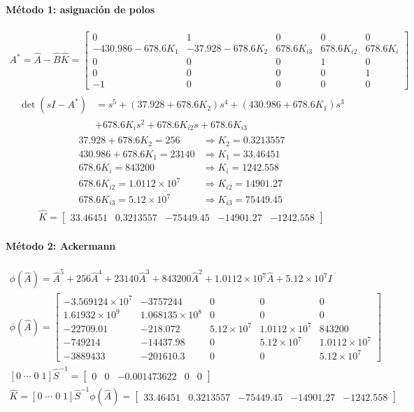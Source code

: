 \documentclass[11pt]{article}
\begin{document}
\paragraph{Método 1: asignación de polos}
\begin{gather*}
A^*=\hat A-\hat B\hat K=\begin{bmatrix}0&1&0&0&0\\-430.986-678.6K_1&-37.928-678.6K_2&678.6K_{i3}&678.6K_{i2}&678.6K_i\\0&0&0&1&0\\0&0&0&0&1\\-1&0&0&0&0\end{bmatrix}
\end{gather*}
\begin{gather*}
\begin{aligned}\det(sI-A^*)&=s^{5}+(37.928+678.6K_2)s^{4}+(430.986+678.6K_1)s^{3}\\&+678.6K_is^{2}+678.6K_{i2}s+678.6K_{i3}\end{aligned}
\end{gather*}
\begin{align*}
37.928+678.6K_2=256&\Rightarrow K_2=0.3213557\\
430.986+678.6K_1=23140&\Rightarrow K_1=33.46451\\
678.6K_i=843200&\Rightarrow K_i=1242.558\\
678.6K_{i2}=1.0112\times10^{7}&\Rightarrow K_{i2}=14901.27\\
678.6K_{i3}=5.12\times10^{7}&\Rightarrow K_{i3}=75449.45
\end{align*}
\begin{gather*}
\hat K=\begin{bmatrix}33.46451 & 0.3213557 & -75449.45 & -14901.27 & -1242.558\end{bmatrix}
\end{gather*}
\paragraph{Método 2: Ackermann}
\begin{gather*}
\phi(\hat A)=\hat A^{5} + 256\hat A^{4} + 23140\hat A^{3} + 843200\hat A^{2} + 1.0112\times10^{7}\hat A + 5.12\times10^{7}I\\
\phi(\hat A)=\begin{bmatrix}-3.569124\times10^{7} & -3757244 & 0 & 0 & 0 \\ 1.61932\times10^{9} & 1.068135\times10^{8} & 0 & 0 & 0 \\ -22709.01 & -218.072 & 5.12\times10^{7} & 1.0112\times10^{7} & 843200 \\ -749214 & -14437.98 & 0 & 5.12\times10^{7} & 1.0112\times10^{7} \\ -3889433 & -201610.3 & 0 & 0 & 5.12\times10^{7}\end{bmatrix}\\
[0\;\cdots\;0\;1]\hat S^{-1}=\begin{bmatrix}0 & 0 & -0.001473622 & 0 & 0\end{bmatrix}\\
\hat K=[0\;\cdots\;0\;1]\hat S^{-1}\phi(\hat A)=\begin{bmatrix}33.46451 & 0.3213557 & -75449.45 & -14901.27 & -1242.558\end{bmatrix}
\end{gather*}
\end{document}

